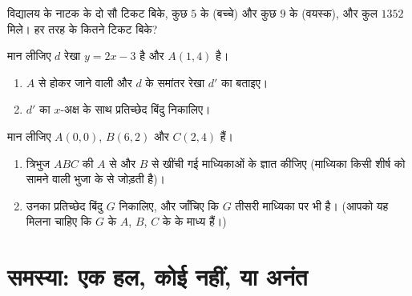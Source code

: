\begin{exercise}[$\star\star$]\label{exo:g10:lines:8}
विद्यालय के नाटक के दो सौ टिकट बिके, कुछ $5$ के (बच्चे) और कुछ $9$ के
(वयस्क), और कुल $1352$ मिले। हर तरह के कितने टिकट बिके?
\end{exercise}

\begin{exercise}[$\star\star$]\label{exo:g10:lines:9}
मान लीजिए $d$ रेखा $y = 2x - 3$ है और $A(1, 4)$ है।
\begin{enumerate}
  \item $A$ से होकर जाने वाली और $d$ के समांतर रेखा $d'$ का 
        बताइए।
  \item $d'$ का $x$-अक्ष के साथ प्रतिच्छेद बिंदु निकालिए।
\end{enumerate}
\end{exercise}

\begin{exercise}[$\star\star\star$]\label{exo:g10:lines:10}
मान लीजिए $A(0, 0)$, $B(6, 2)$ और $C(2, 4)$ हैं।
\begin{enumerate}
  \item त्रिभुज $ABC$ की $A$ से और $B$ से खींची गई माध्यिकाओं के
         ज्ञात कीजिए (माध्यिका किसी शीर्ष को सामने वाली भुजा के
         से जोड़ती है)।
  \item उनका प्रतिच्छेद बिंदु $G$ निकालिए, और जाँचिए कि $G$ तीसरी
        माध्यिका पर भी है। (आपको यह मिलना चाहिए कि $G$ के 
        $A$, $B$, $C$ के  के माध्य हैं।)
\end{enumerate}
\end{exercise}

\section{समस्या: एक हल, कोई नहीं, या अनंत}

